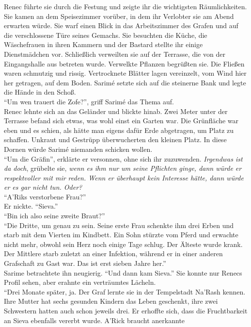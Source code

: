Renec führte sie durch die Festung und zeigte ihr die wichtigsten Räumlichkeiten. Sie kamen an dem 
Speisezimmer vorüber, in dem ihr Verlobter sie am Abend erwarten würde. Sie warf einen Blick in das 
Arbeitszimmer des Grafen und auf die verschlossene Türe seines Gemachs. Sie besuchten die Küche, 
die Wäschefrauen in ihren Kammern und der Bastard stellte ihr einige Dienstmädchen vor. Schließlich 
verweilten sie auf der Terrasse, die von der Eingangshalle aus betreten wurde. Verwelkte Pflanzen 
begrüßten sie. Die Fließen waren schmutzig und rissig. Vertrocknete Blätter lagen vereinzelt, vom 
Wind hier her getragen, auf dem Boden. Sarimé setzte sich auf die steinerne Bank und legte die 
Hände in den Schoß. \\
``Um wen trauert die Zofe?'', griff Sarimé das Thema auf.\\
Renec lehnte sich an das Geländer und blickte hinab. Zwei Meter unter der Terrasse befand sich 
etwas, was wohl einst ein Garten war. Die Grünfläche war eben und es schien, als hätte man eigens 
dafür Erde abgetragen, um Platz zu schaffen. Unkraut und Gestrüpp überwucherten den kleinen Platz. 
In diese Dornen würde Sarimé niemanden schicken wollen.\\
``Um die Gräfin'', erklärte er versonnen, ohne sich ihr zuzuwenden.
\textit{Irgendwas ist da doch}, grübelte sie, \textit{wenn es ihm nur um seine Pflichten ginge, 
dann würde er respektvoller mit mir reden. Wenn er überhaupt kein Interesse hätte, dann würde er es 
gar nicht tun. Oder?}\\
``A'Riks verstorbene Frau?''\\
Er nickte. ``Sieva.''\\
``Bin ich also seine zweite Braut?''\\
``Die Dritte, um genau zu sein. Seine erste Frau schenkte ihm drei Erben und starb mit dem Vierten 
im Kindbett. Ein Sohn stürzte vom Pferd und erwachte nicht mehr, obwohl sein Herz noch einige Tage 
schlug. Der Älteste wurde krank. Der Mittlere starb zuletzt an einer Infektion, während er in einer 
anderen Grafschaft zu Gast war. Das ist erst sieben Jahre her.''\\
Sarime betrachtete ihn neugierig. ``Und dann kam Sieva.'' Sie konnte nur Renecs Profil sehen, aber 
erahnte ein verträumtes Lächeln.\\
``Drei Monate später, ja. Der Graf lernte sie in der Tempelstadt Na'Rash kennen. Ihre Mutter hat 
sechs gesunden Kindern das Leben geschenkt, ihre zwei Schwestern hatten auch schon jeweils drei. Er 
erhoffte sich, dass die Fruchtbarkeit an Sieva ebenfalls vererbt wurde. A'Rick braucht anerkannte 
